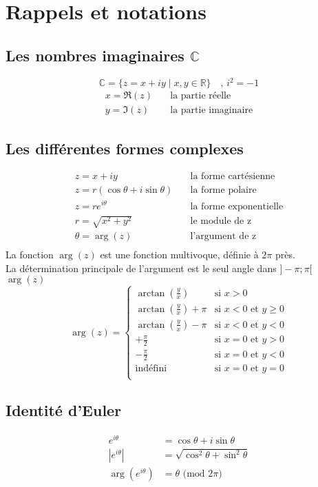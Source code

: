 \section{Rappels et notations}

\subsection{Les nombres imaginaires $\mathbb{C}$}
$$\mathbb{C}=\{z=x+iy\mid x,y\in\mathbb{R}\} \quad \text{, } i^2=-1$$
\begin{align*}
    x=\Re(z)\quad&\text{la partie réelle} \\
    y=\Im(z)\quad&\text{la partie imaginaire}
\end{align*}

\subsection{Les différentes formes complexes}
\begin{align*}
    z = x+iy\quad&\text{la forme cartésienne} \\
    z = r(\cos\theta+i\sin\theta)\quad&\text{la forme polaire} \\
    z = re^{i\theta}\quad&\text{la forme exponentielle} \\
    r = \sqrt{x^2+y^2}\quad&\text{le module de z} \\
    \theta = \arg(z)\quad&\text{l'argument de z} \\
\end{align*}
La fonction $\arg(z)$ est une fonction multivoque, définie à $2\pi$ près. \\
La détermination principale de l'argument est le seul angle dans $]-\pi;\pi[$  $\arg(z)$\\
$$
\arg(z) = 
\begin{cases}
    \arctan\left(\frac{y}{x}\right) & \text{si } x > 0 \\
    \arctan\left(\frac{y}{x}\right) + \pi & \text{si } x < 0 \text{ et } y \geq 0 \\
    \arctan\left(\frac{y}{x}\right) - \pi & \text{si } x < 0 \text{ et } y < 0 \\
    +\frac{\pi}{2} & \text{si } x = 0 \text{ et } y > 0 \\
    -\frac{\pi}{2} & \text{si } x = 0 \text{ et } y < 0 \\
    \text{indéfini} & \text{si } x = 0 \text{ et } y = 0 \\
\end{cases}
$$

\subsection{Identité d'Euler}
\begin{align*}
    e^{i\theta}&=\cos\theta+i\sin\theta \\
    |e^{i\theta}|&=\sqrt{\cos^2\theta+\sin^2\theta} \\
    \arg(e^{i\theta})&=\theta\text{ (mod }2\pi)
\end{align*}